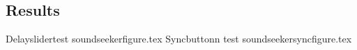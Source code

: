 \subsection{Results}
Delayslidertest
{soundseekerfigure.tex}
Syncbuttonn test
{soundseekersyncfigure.tex}

